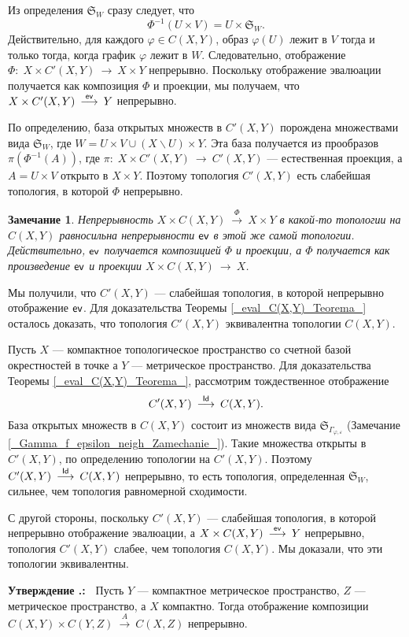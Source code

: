 \documentclass[12pt]{book}
\newcommand{\arrow}{{\:\longrightarrow\:}}
\renewcommand{\phi}{\varphi}
\renewcommand{\epsilon}{\varepsilon}
\def\Id{{\operatorname{\sf Id}}}
\newcommand{\ev}{\operatorname{\sf ev}}
\theoremstyle{upshape}
\newtheorem{zadacha}{Задача}[chapter]
\theoremstyle{generic}
\newtheorem{remark}[teorema]{Замечание}
\def\замечание{\begin{remark}}
\def\еза{\end{remark}}
\theoremstyle{upshapenonumber}
\newtheorem{ukazanie}{Указание}[section]
\newcommand{\следствие}{%
     \refstepcounter{teorema}
     {\noindent\bf Следствие \thechapter.\arabic{teorema}:\ }}
\newcommand{\пример}{%
     \refstepcounter{teorema}
     {\noindent\bf Пример \thechapter.\arabic{teorema}:\ }}
\newcommand{\лемма}{%
     \refstepcounter{teorema}
     {\noindent\bf Лемма \thechapter.\arabic{teorema}:\ }}
\newcommand{\теорема}{%
     \refstepcounter{teorema}
     {\noindent\bf Теорема \thechapter.\arabic{teorema}:\ }}
\newcommand{\утверждение}{%
     \refstepcounter{teorema}
     {\noindent\bf Утверждение \thechapter.\arabic{teorema}:\ }}
\def\ем{\em}
\def\задача{\begin{zadacha}}
\def\ез{\end{zadacha}}
\def\указание{\begin{ukazanie}}
\def\еу{\end{ukazanie}}
\def\ео{\end{opredelenie}}
\def\goth{\mathfrak}
\def\енум{\begin{enumerate}}
\def\ее{\end{enumerate}}
\begin{document}
Из определения ${\goth S}_W$ сразу следует, что
\[
\Phi^{-1}(U\times V) = U \times {\goth S}_W.
\]
Действительно, для каждого $\phi\in C(X,Y)$,
образ $\phi(U)$ лежит в $V$ тогда и только тогда,
когда график $\phi$ лежит в $W$.
Следовательно, отображение
$\Phi:\; X \times C'(X,Y)\arrow X \times Y$
непрерывно. Поскольку отображение эвалюации
получается как композиция $\Phi$ и проекции,
мы получаем, что $X \times C'(X,Y) \stackrel{\ev}\arrow Y$
непрерывно.

По определению,
база открытых множеств в $C'(X,Y)$ порождена
множествами вида  ${\goth S}_W$, где
$W= U \times V \cup (X \backslash U) \times Y$.
Эта база получается из прообразов
$\pi(\Phi^{-1}(A))$, где 
$\pi:\; X \times C'(X,Y) \arrow C'(X,Y)$ --- естественная
проекция, а $A=U \times V $ открыто в $X\times Y$. Поэтому
топология $C'(X,Y)$ есть слабейшая топология, в которой
$\Phi$ непрерывно. 

\замечание
Непрерывность 
$X \times C(X,Y)\stackrel \Phi\arrow X \times Y$ в
какой-то топологии на $C(X,Y)$ равносильна
непрерывности $\ev$ в этой же самой топологии.
Действительно, $\ev$ получается композицией $\Phi$
и проекции, а $\Phi$ получается как произведение
$\ev$ и проекции $X \times C(X,Y)\arrow X$.
\еза

Мы получили, что $C'(X,Y)$ --- слабейшая
топология, в которой непрерывно отображение $\ev$.
Для доказательства Теоремы \ref{_eval_C(X,Y)_Teorema_}
осталось доказать, что топология $C'(X,Y)$
эквивалентна топологии $C(X,Y)$.

Пусть $X$ --- компактное топологическое пространство
со счетной базой окрестностей в точке
а $Y$ --- метрическое пространство.
Для доказательства Теоремы \ref{_eval_C(X,Y)_Teorema_},
рассмотрим тождественное отображение
\[C'(X,Y) \stackrel \Id \arrow C(X,Y).\] База открытых множеств
в $C(X,Y)$ состоит из множеств вида 
${\goth S}_{\Gamma_{\phi, \epsilon}}$
(Замечание \ref{_Gamma_f_epsilon_neigh_Zamechanie_}).
Такие множества открыты в $C'(X,Y)$, по
определению топологии на $C'(X,Y)$.
Поэтому $C'(X,Y) \stackrel \Id \arrow C(X,Y)$
непрерывно, то есть топология, определенная ${\goth S}_W$,
сильнее, чем топология равномерной сходимости.

С другой стороны, поскольку  $C'(X,Y)$ --- слабейшая
топология, в которой непрерывно отображение
эвалюации, а $X \times C(X,Y) \stackrel{\ev}\arrow Y$
непрерывно, топология $C'(X,Y)$ слабее,
чем топология $C(X,Y)$. Мы доказали,
что эти топологии эквивалентны.

\hfill

\утверждение
Пусть $Y$ --- компактное метрическое пространство,
$Z$ --- метрическое пространство, а $X$ компактно.
Тогда отображение композиции
$C(X,Y) \times C(Y,Z) \stackrel A \arrow C(X,Z)$ непрерывно.
\end{document}
